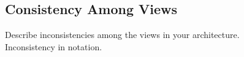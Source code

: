 \subsection{Consistency Among Views}	
Describe inconsistencies among the views in your architecture.\\	
Inconsistency in notation.\\